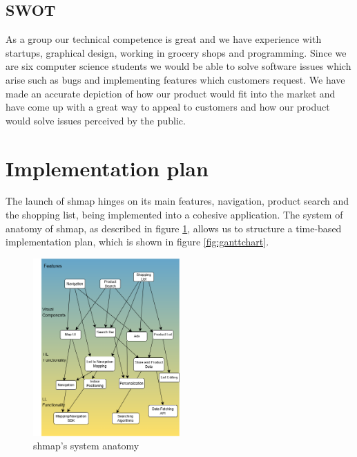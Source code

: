 \documentclass[titlepage]{article}
\def\companyName{shmap}
\begin{document}
\subsection{SWOT}

As a group our technical competence is great and we have experience with startups, graphical design, working in grocery shops and programming. Since we are six computer science students we would be able to solve software issues which arise such as bugs and implementing features which customers request. We have made an accurate depiction of how our product would fit into the market and have come up with a great way to appeal to customers and how our product would solve issues perceived by the public.

\section{Implementation plan}

The launch of shmap hinges on its main features, navigation, product search and the shopping list, being implemented into a cohesive application. The system of anatomy of \companyName, as described in figure \ref{fig:sysanat}, allows us to structure a time-based implementation plan, which is shown in figure \ref{fig:ganttchart}.

\begin{figure}[h]
    \centering
    \includegraphics[width=0.5\textwidth]{SystemAnatomy.png}
    \caption{\companyName's system anatomy}
    \label{fig:sysanat}
\end{figure}
\end{document}
